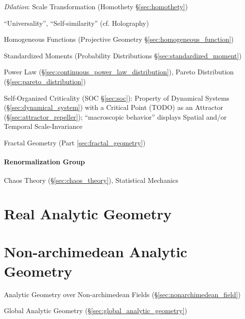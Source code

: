 \emph{Dilation}: Scale Transformation (Homothety \S\ref{sec:homothety})

``Universality'', ``Self-similarity'' (cf. Holography)

\fist Homogeneous Functions (Projective Geometry
\S\ref{sec:homogeneous_function})

\fist Standardized Moments (Probability Distributions
\S\ref{sec:standardized_moment})

Power Law (\S\ref{sec:continuous_power_law_distribution}),
Pareto Distribution (\S\ref{sec:pareto_distribution})

Self-Organized Criticality (SOC \S\ref{sec:soc}): Property of Dynamical Systems
(\S\ref{sec:dynamical_system}) with a Critical Point (TODO) as an Attractor
(\S\ref{sec:attractor_repeller}); ``macroscopic behavior'' displays Spatial
and/or Temporal Scale-Invariance

\fist Fractal Geometry (Part \ref{sec:fractal_geometry})



\paragraph{Renormalization Group}\label{sec:renormalization_group}\hfill

Chaos Theory (\S\ref{sec:chaos_theory}), Statistical Mechanics



\section{Real Analytic Geometry}\label{sec:real_analytic_geometry}

\section{Non-archimedean Analytic Geometry}
\label{sec:nonarchimedean_analytic_geometry}

Analytic Geometry over Non-archimedean Fields (\S\ref{sec:nonarchimedean_field})

\fist Global Analytic Geometry (\S\ref{sec:global_analytic_geometry})



